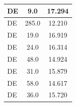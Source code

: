 \documentclass{article}
\begin{document}
\begin{table}[htbp]
\begin{tabular}{|l|c|c|}
DE&9.0&17.294\\\hline %
DE&285.0&12.210\\\hline %
DE&19.0&16.919\\\hline %
DE&24.0&16.314\\\hline %
DE&48.0&14.924\\\hline %
DE&31.0&15.879\\\hline %
DE&58.0&14.617\\\hline %
DE&36.0&15.720\\\hline %
\end{tabular}
\vspace{-3.75mm}
\end{table}
\end{document}
